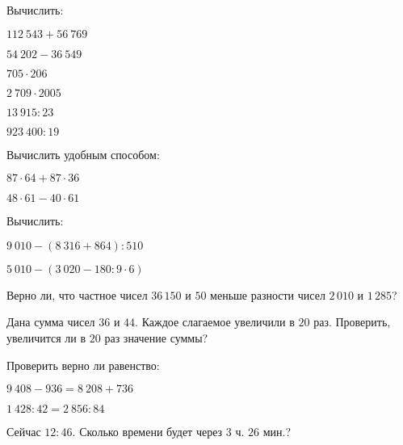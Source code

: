 \begin{listofex}
	\item Вычислить:
	\begin{enumcols}[itemcolumns=3]
		\item \( 112\:543 + 56\:769 \)
		\item \( 54\:202 - 36\:549 \)
		\item \( 705 \cdot 206 \)
		\item \( 2\:709 \cdot 2005 \)
		\item \( 13\:915:23 \)
		\item \( 923\:400:19 \)
	\end{enumcols}
	\item Вычислить удобным способом:
	\begin{enumcols}[itemcolumns=2]
		\item \( 87\cdot64 + 87\cdot36 \)
		\item \( 48\cdot61 - 40\cdot61 \)
	\end{enumcols}
	\item Вычислить:
	\begin{enumcols}[itemcolumns=2]
		\item \( 9\:010-(8\:316+864):510 \)
		\item \( 5\:010-(3\:020-180:9\cdot6) \)
	\end{enumcols}
	\item Верно ли, что частное чисел \( 36\,150 \) и \( 50 \) меньше разности чисел \( 2\,010 \) и \( 1\,285 \)?
	\item Дана сумма чисел \( 36 \) и \( 44 \). Каждое слагаемое увеличили в \( 20 \) раз. Проверить, увеличится ли в \( 20 \) раз значение суммы?
	\item Проверить верно ли равенство:
	\begin{enumcols}[itemcolumns=2]
		\item \( 9\:408-936 = 8\:208+736 \)
		\item \( 1\:428:42 = 2\:856:84 \)
	\end{enumcols}
	\item Сейчас \( 12:46 \). Сколько времени будет через \( 3 \) ч. \( 26 \) мин.?

\end{listofex}
